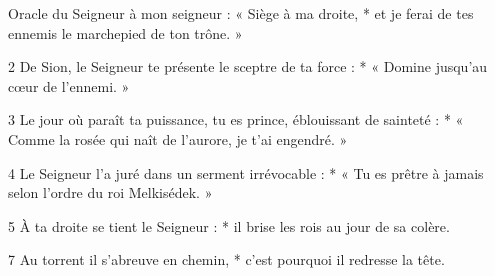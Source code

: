 Oracle du Seigneur à mon seigneur :
   « Siège à ma droite, *
et je ferai de tes ennemis
   le marchepied de ton trône. »

2 De Sion, le Seigneur te présente
   le sceptre de ta force : *
« Domine jusqu'au cœur de l'ennemi. »

3 Le jour où paraît ta puissance,
   tu es prince, éblouissant de sainteté : *
« Comme la rosée qui naît de l'aurore,
   je t'ai engendré. »

4 Le Seigneur l'a juré
   dans un serment irrévocable : *
« Tu es prêtre à jamais
   selon l'ordre du roi Melkisédek. »

5 À ta droite se tient le Seigneur : *
il brise les rois au jour de sa colère.

7 Au torrent il s'abreuve en chemin, *
c'est pourquoi il redresse la tête.